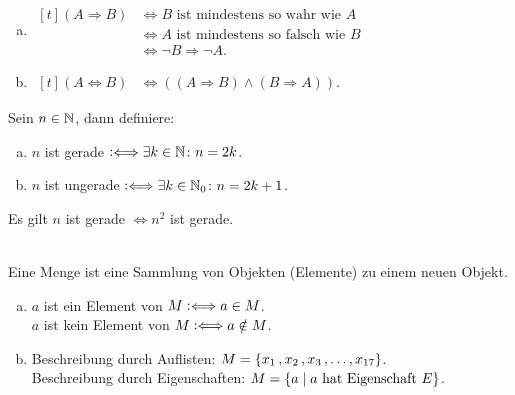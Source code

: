 \documentclass[../ana1.tex]{subfiles}
\begin{document}
\begin{bem}\leavevmode
	\begin{enumerate}[(a)]
		\item \(\begin{aligned}[t]
					(A \Rightarrow B) &\Leftrightarrow B \text{ ist mindestens so wahr wie } A\\
									&\Leftrightarrow A \text{ ist mindestens so falsch wie } B\\
									&\Leftrightarrow \neg B \Rightarrow \neg A.
			    \end{aligned}\)
		\item \(\begin{aligned}[t]
			    	(A \Leftrightarrow B) &\Leftrightarrow ((A \Rightarrow B) \wedge (B \Rightarrow A)).
			    \end{aligned}\)
	\end{enumerate}
\end{bem}
\begin{defi*}
	Sein \(n \in \mathbb{N} \), dann definiere:
	\begin{enumerate}[(a)]
		\item \(n\) ist gerade \(\mathrel{\vcentcolon\Longleftrightarrow} \exists k \in \mathbb{N} \colon n = 2k\).
		\item \(n\) ist ungerade \(\mathrel{\vcentcolon\Longleftrightarrow} \exists k \in \mathbb{N}_{0} \colon n = 2k + 1\).
	\end{enumerate}
\end{defi*}
\begin{bsp}
	Es gilt \(n\) ist gerade \(\iff n^2\) ist gerade.
	\begin{bew}
	\end{bew}
\end{bsp}

\begin{defi*}\leavevmode \\
	Eine Menge ist eine Sammlung von Objekten (Elemente) zu einem neuen Objekt.
\end{defi*}

\begin{notation}\leavevmode
	\begin{enumerate}[(a)]
		\item \(a\) ist ein Element von \(M \mathrel{\vcentcolon\Longleftrightarrow} a \in M\).\\
			  \(a\) ist kein Element von \(M \mathrel{\vcentcolon\Longleftrightarrow} a \notin M\).
		\item Beschreibung durch Auflisten: \(M = \{x_{1} \operatorname{,} x_{2} \operatorname{,} x_{3} \operatorname{,} \ldots \operatorname{,} x_{17}\}\).\\
			  Beschreibung durch Eigenschaften: \(M = \{a \; \vert \; a \text{ hat Eigenschaft } E\}\).
	\end{enumerate}
\end{notation}
\end{document}
